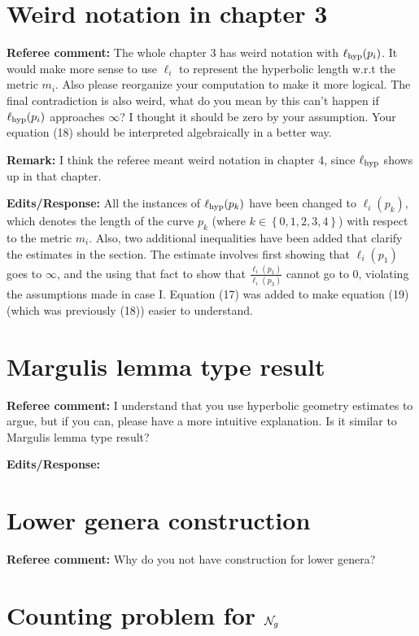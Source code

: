 \documentclass[12pt, reqno]{amsart}
\begin{document}
\section{Weird notation in chapter 3}
\label{sec:weird-notat-chapt}

\textbf{Referee comment:} The whole chapter 3 has weird notation with $\ell_{\mathrm{hyp}}(p_i)$. It would make more sense to use $\ell_i$ to represent the hyperbolic length w.r.t the metric $m_i$.
Also please reorganize your computation to make it more logical. The final contradiction is also weird, what do you mean by this can't happen if $\ell_{\mathrm{hyp}}(p_i)$ approaches $\infty$? I thought it should be zero by your assumption. Your equation (18) should be interpreted algebraically in a better way.

\textbf{Remark:} I think the referee meant weird notation in chapter 4, since $\ell_{\mathrm{hyp}}$ shows up in that chapter.

\textbf{Edits/Response:} All the instances of $\ell_{\mathrm{hyp}}(p_k)$ have been changed to $\ell_i(p_k)$, which denotes the length of the curve $p_k$ (where $k \in \left\{ 0, 1, 2, 3, 4 \right\}$) with respect to the metric $m_i$.
Also, two additional inequalities have been added that clarify the estimates in the section. The estimate involves first showing that $\ell_i(p_1)$ goes to $\infty$, and the using that fact to show that $\frac{\ell_i(p_1)}{\ell_i(p_3)}$ cannot go to $0$, violating the assumptions made in case I.
Equation (17) was added to make equation (19) (which was previously (18)) easier to understand.

\section{Margulis lemma type result}
\label{sec:margulis-lemma-type}

\textbf{Referee comment:} I understand that you use hyperbolic geometry estimates to argue, but if you can, please have a more intuitive explanation. Is it similar to Margulis lemma type result?

\textbf{Edits/Response:}

\section{Lower genera construction}
\label{sec:lower-genera-constr}

\textbf{Referee comment:} Why do you not have construction for lower genera?

\section{Counting problem for $\mathcal{N}_g$}
\label{sec:counting-problem}
\end{document}
